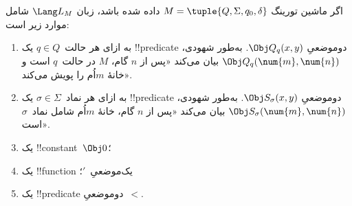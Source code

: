 \documentclass[../../../include/open-logic-section]{subfiles}
\begin{document}
\begin{defn}
اگر ماشین تورینگ $M=\tuple{Q,\Sigma,q_0,\delta}$ داده شده باشد، زبان
$\Lang L_M$ شامل موارد زیر است:
\begin{enumerate}
\item به ازای هر حالت~$q\in Q$ یک !!{predicate} دوموضعیِ
  $\Obj Q_q(x,y)$. به‌طور شهودی، $\Obj Q_q(\num{m},\num{n})$ بیان
  می‌کند «پس از $n$ گام، $M$ در حالت~$q$ است و خانهٔ $m$اُم را پویش
  می‌کند».
\item به ازای هر نماد~$\sigma\in\Sigma$ یک !!{predicate} دوموضعیِ
  $\Obj S_\sigma(x,y)$. به‌طور شهودی،
  $\Obj S_\sigma(\num{m},\num{n})$ بیان می‌کند «پس از $n$ گام، خانهٔ
  $m$اُم شامل نماد~$\sigma$ است».
\item یک !!{constant}~$\Obj 0$؛
\item یک !!{function} یک‌موضعیِ~$\prime$؛
\item یک !!{predicate} دوموضعیِ~$<$.
\end{enumerate}
\end{defn}
\end{document}
